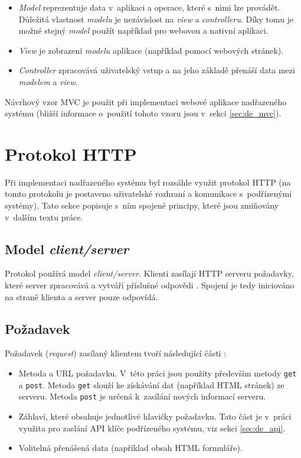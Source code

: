 \begin{itemize}
    \item \textit{Model} reprezentuje data v~aplikaci a operace, které s~nimi lze provádět. Důležitá vlastnost \textit{modelu} je nezávislost na \textit{view} a \textit{controlleru}. Díky tomu je možné stejný \textit{model} použít například pro webovou a nativní aplikaci.
    \item \textit{View} je zobrazení \textit{modelu} aplikace (například pomocí webových stránek).
    \item \textit{Controller} zpracovává uživatelský vstup a na jeho základě přenáší data mezi \textit{modelem} a \textit{view}.
\end{itemize}

Návrhový vzor MVC je použit při implementaci webové aplikace nadřazeného systému (bližší informace o~použití tohoto vzoru jsou v~sekci \ref{sec:de_mvc}).

\section{Protokol HTTP}

Při implementaci nadřazeného systému byl rozsáhle využit protokol HTTP (na tomto protokolu je postaveno uživatelské rozhraní a komunikace s~podřízenými systémy). Tato sekce popisuje s~ním spojené principy, které jsou zmiňovány v~dalším textu práce. 

\subsection{Model \textit{client/server}}

Protokol používá model \textit{client/server}. Klienti zasílají HTTP serveru požadavky, které server zpracovává a vytváří příslušné odpovědi \cite{tcp}. Spojení je tedy iniciováno na straně klienta a server pouze odpovídá. 

\subsection{Požadavek}

Požadavek (\textit{request}) zasílaný klientem tvoří následující části \cite{tcp}:

\begin{itemize}
    \item Metoda a URL požadavku. V~této práci jsou použity především metody \texttt{get} a \texttt{post}. Metoda \texttt{get} slouží ke získávání dat (například HTML stránek) ze serveru. Metoda \texttt{post} je určená k~zasílání nových informací serveru.
    \item Záhlaví, které obsahuje jednotlivé hlavičky požadavku. Tato část je v~práci využita pro zaslání API klíče podřízeného systému, viz sekci \ref{sec:de_api}.
    \item Volitelná přenášená data (například obsah HTML formuláře).
\end{itemize}

